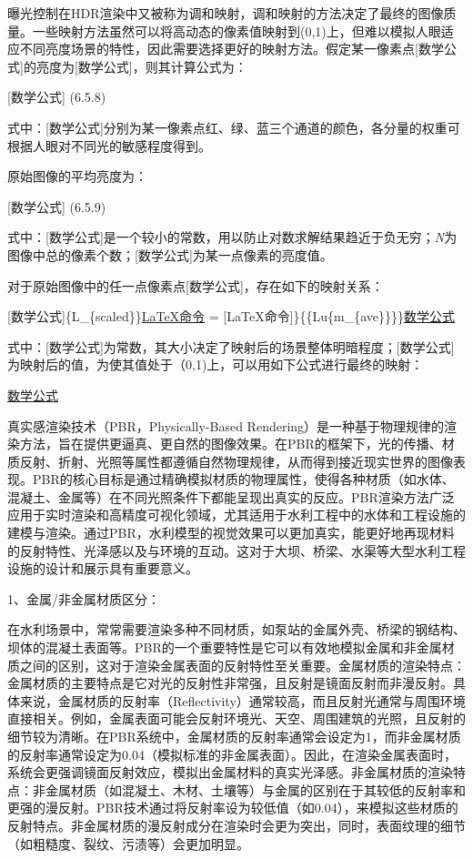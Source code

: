 曝光控制在HDR渲染中又被称为调和映射，调和映射的方法决定了最终的图像质量。一些映射方法虽然可以将高动态的像素值映射到(0,1)上，但难以模拟人眼适应不同亮度场景的特性，因此需要选择更好的映射方法。假定某一像素点{[}数学公式{]}的亮度为{[}数学公式{]}，则其计算公式为：

{[}数学公式{]} (6.5.8)

式中：{[}数学公式{]}分别为某一像素点红、绿、蓝三个通道的颜色，各分量的权重可根据人眼对不同光的敏感程度得到。

原始图像的平均亮度为：

{[}数学公式{]} (6.5.9)

式中：{[}数学公式{]}是一个较小的常数，用以防止对数求解结果趋近于负无穷；\emph{N}为图像中总的像素个数；{[}数学公式{]}为某一点像素的亮度值。

对于原始图像中的任一点像素点{[}数学公式{]}，存在如下的映射关系：

{[}数学公式{]}\{L\_\{scaled\}\}\href{p\%20\%5BLaTeX命令\%5D}{LaTeX命令} = {[}LaTeX命令{]}\}\{\{Lu\{m\_\{ave\}\}\}\}\href{6.5.10}{数学公式}

式中：{[}数学公式{]}为常数，其大小决定了映射后的场景整体明暗程度；{[}数学公式{]}为映射后的值，为使其值处于（0,1)上，可以用如下公式进行最终的映射：

\href{6.5.11}{数学公式}

真实感渲染技术（PBR，Physically-Based Rendering）是一种基于物理规律的渲染方法，旨在提供更逼真、更自然的图像效果。在PBR的框架下，光的传播、材质反射、折射、光照等属性都遵循自然物理规律，从而得到接近现实世界的图像表现。PBR的核心目标是通过精确模拟材质的物理属性，使得各种材质（如水体、混凝土、金属等）在不同光照条件下都能呈现出真实的反应。PBR渲染方法广泛应用于实时渲染和高精度可视化领域，尤其适用于水利工程中的水体和工程设施的建模与渲染。通过PBR，水利模型的视觉效果可以更加真实，能更好地再现材料的反射特性、光泽感以及与环境的互动。这对于大坝、桥梁、水渠等大型水利工程设施的设计和展示具有重要意义。

1、金属/非金属材质区分：

在水利场景中，常常需要渲染多种不同材质，如泵站的金属外壳、桥梁的钢结构、坝体的混凝土表面等。PBR的一个重要特性是它可以有效地模拟金属和非金属材质之间的区别，这对于渲染金属表面的反射特性至关重要。金属材质的渲染特点：金属材质的主要特点是它对光的反射性非常强，且反射是镜面反射而非漫反射。具体来说，金属材质的反射率（Reflectivity）通常较高，而且反射光通常与周围环境直接相关。例如，金属表面可能会反射环境光、天空、周围建筑的光照，且反射的细节较为清晰。在PBR系统中，金属材质的反射率通常会设定为1，而非金属材质的反射率通常设定为0.04（模拟标准的非金属表面）。因此，在渲染金属表面时，系统会更强调镜面反射效应，模拟出金属材料的真实光泽感。非金属材质的渲染特点：非金属材质（如混凝土、木材、土壤等）与金属的区别在于其较低的反射率和更强的漫反射。PBR技术通过将反射率设为较低值（如0.04），来模拟这些材质的反射特点。非金属材质的漫反射成分在渲染时会更为突出，同时，表面纹理的细节（如粗糙度、裂纹、污渍等）会更加明显。

